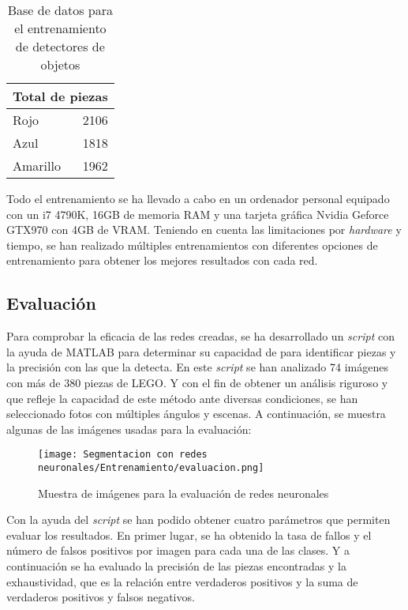 \begin{table}[ht]
  \centering
    \begin{tabular}{|l|r|}
    \hline
    \multicolumn{2}{|c|}{Total de piezas}\\
    \hline
    Rojo & 2106 \\
    \hline
    Azul & 1818 \\
    \hline
    Amarillo & 1962 \\
    \hline
    \end{tabular}%
    \caption{Base de datos para el entrenamiento de detectores de objetos}
  \label{tab:RCNN imagenes}%
\end{table}%

Todo el entrenamiento se ha llevado a cabo en un ordenador personal equipado con un i7 4790K, 16GB de memoria RAM y una tarjeta gráfica Nvidia Geforce GTX970 con 4GB de VRAM. Teniendo en cuenta las limitaciones por \textit{hardware} y tiempo, se han realizado múltiples entrenamientos con diferentes opciones de entrenamiento para obtener los mejores resultados con cada red.

\subsection{Evaluación}
\label{subsec:evaluacion}
Para comprobar la eficacia de las redes creadas, se ha desarrollado un \textit{script} con la ayuda de MATLAB para determinar su capacidad de para identificar piezas y la precisión con las que la detecta. En este \textit{script} se han analizado 74 imágenes con más de 380 piezas de LEGO. Y con el fin de obtener un análisis riguroso y que refleje la capacidad de este método ante diversas condiciones, se han seleccionado fotos con múltiples ángulos y escenas. A continuación, se muestra algunas de las imágenes usadas para la evaluación:

\begin{figure}[ht]  %
	\centering
	\texttt{[image: Segmentacion con redes neuronales/Entrenamiento/evaluacion.png]}
	\caption{Muestra de imágenes para la evaluación de redes neuronales}
	\label{fig:evaluacion redes}
\end{figure}

Con la ayuda del \textit{script} se han podido obtener cuatro parámetros que permiten evaluar los resultados. En primer lugar, se ha obtenido la tasa de fallos y el número de falsos positivos por imagen para cada una de las clases. Y a continuación se ha evaluado la precisión de las piezas encontradas y la exhaustividad, que es la relación entre verdaderos positivos y la suma de verdaderos positivos y falsos negativos.

